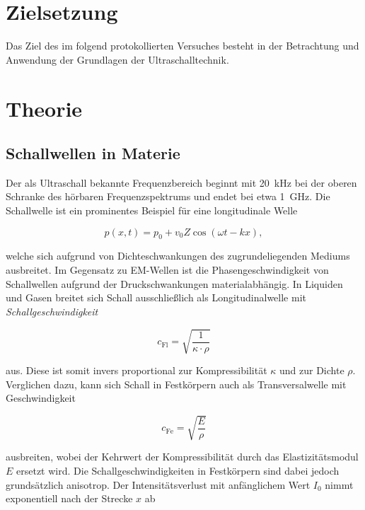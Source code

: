 %

%

\section{Zielsetzung}

Das Ziel des im folgend protokollierten Versuches besteht in der Betrachtung und Anwendung der Grundlagen der 
Ultraschalltechnik.

\section{Theorie}
\label{sec:Theorie}

\subsection{Schallwellen in Materie}

\noindent Der als Ultraschall bekannte Frequenzbereich beginnt mit \qty{20}{\kilo\hertz} bei der oberen Schranke des hörbaren 
Frequenzspektrums und endet bei etwa \qty{1}{\giga\hertz}. Die Schallwelle ist ein prominentes Beispiel für eine longitudinale 
Welle 

\begin{equation*}
    p\left(x,t\right) = p_0 + v_0Z\cos\left(\omega{}t - kx\right),
\end{equation*}

\noindent welche sich aufgrund von Dichteschwankungen des zugrundeliegenden Mediums ausbreitet. Im Gegensatz zu EM-Wellen ist 
die Phasengeschwindigkeit von Schallwellen aufgrund der Druckschwankungen materialabhängig. In Liquiden und Gasen breitet sich 
Schall ausschließlich als Longitudinalwelle mit \emph{Schallgeschwindigkeit}

\begin{equation*}
    c_\text{Fl} = \sqrt{\frac{1}{\kappa\cdot\rho}}
\end{equation*}

\noindent aus. Diese ist somit invers proportional zur Kompressibilität $\kappa$ und zur Dichte $\rho$. Verglichen dazu, kann sich Schall 
in Festkörpern auch als Transversalwelle mit Geschwindigkeit 

\begin{equation*}
        c_\text{Fe} = \sqrt{\frac{E}{\rho}}
\end{equation*}

\noindent ausbreiten, wobei der Kehrwert der Kompressibilität durch das Elastizitätsmodul $E$ ersetzt wird. Die Schallgeschwindigkeiten
in Festkörpern sind dabei jedoch grundsätzlich anisotrop. Der Intensitätsverlust mit anfänglichem Wert $I_0$ nimmt 
exponentiell nach der Strecke $x$ ab 

